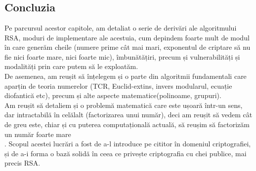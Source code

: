 \documentclass[12pt, oneside]{book}
\begin{document}
\chapter*{}
\section*{Concluzia}
Pe parcursul acestor capitole, am detaliat o serie de derivări ale algoritmului RSA, moduri de implementare ale acestuia, cum depindem foarte mult de modul în care generăm cheile (numere prime cât mai mari, exponentul de criptare să nu fie nici foarte mare, nici foarte mic), îmbunătățiri, precum și vulnerabilități și modalități prin care putem să le exploatăm. \\
De asemenea, am reușit să înțelegem și o parte din algoritmii fundamentali care aparțin de teoria numerelor (TCR, Euclid-extins, invers modularul, ecuație diofantică etc), precum și alte aspecte matematice(polinoame, grupuri). \\
Am reușit să detaliem și o problemă  matematică care este ușoară într-un sens, dar intractabilă în celălalt (factorizarea unui număr), deci am reușit să vedem cât de greu este, chiar și cu puterea computațională actuală, să reușim să factorizăm un număr foarte mare\\. 
Scopul acestei lucrări a fost de a-l introduce pe cititor în domeniul criptografiei, și de a-i forma o bază solidă în ceea ce privește criptografia cu chei publice, mai precis RSA.



\medskip
\end{document}
